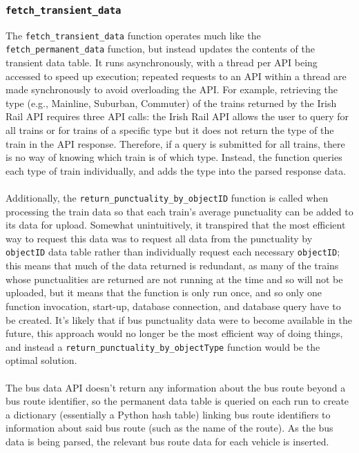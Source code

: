 \documentclass[a4paper,11pt]{report}
\begin{document}
\subsubsection{\texttt{fetch_transient_data}}
The \verb|fetch_transient_data| function operates much like the \verb|fetch_permanent_data| function, but instead updates the contents of the transient data table.
It runs asynchronously, with a thread per API being accessed to speed up execution;
repeated requests to an API within a thread are made synchronously to avoid overloading the API.
For example, retrieving the type (e.g., Mainline, Suburban, Commuter) of the trains returned by the Irish Rail API requires three API calls:
the Irish Rail API allows the user to query for all trains or for trains of a specific type but it does not return the type of the train in the API response.
Therefore, if a query is submitted for all trains, there is no way of knowing which train is of which type.
Instead, the function queries each type of train individually, and adds the type into the parsed response data.
\\\\
Additionally, the \verb|return_punctuality_by_objectID| function is called when processing the train data so that each train's average punctuality can be added to its data for upload.
Somewhat unintuitively, it transpired that the most efficient way to request this data was to request all data from the punctuality by \verb|objectID| data table rather than individually request each necessary \verb|objectID|;
this means that much of the data returned is redundant, as many of the trains whose punctualities are returned are not running at the time and so will not be uploaded, but it means that the function is only run once, and so only one function invocation, start-up, database connection, and database query have to be created.
It's likely that if bus punctuality data were to become available in the future, this approach would no longer be the most efficient way of doing things, and instead a \verb|return_punctuality_by_objectType| function would be the optimal solution.
\\\\
The bus data API doesn't return any information about the bus route beyond a bus route identifier, so the permanent data table is queried on each run to create a dictionary (essentially a Python hash table\supercite{pythondict}) linking bus route identifiers to information about said bus route (such as the name of the route).
As the bus data is being parsed, the relevant bus route data for each vehicle is inserted.
\end{document}
